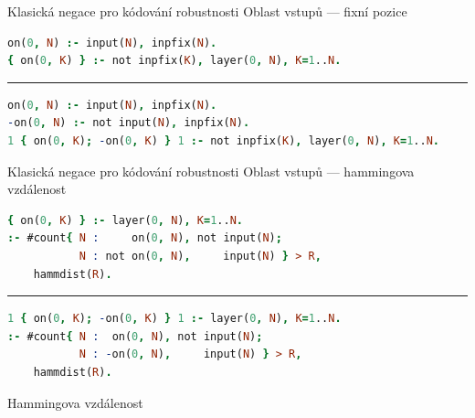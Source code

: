 \documentclass{beamer}
\begin{document}
    \begin{frame}[fragile]{Klasická negace pro kódování robustnosti}
        Oblast vstupů --- fixní pozice
\begin{lstlisting}[language=Prolog, numbers=none]
on(0, N) :- input(N), inpfix(N).
{ on(0, K) } :- not inpfix(K), layer(0, N), K=1..N.
\end{lstlisting}
        \hrule
\begin{lstlisting}[language=Prolog, numbers=none]
 on(0, N) :- input(N), inpfix(N).
-on(0, N) :- not input(N), inpfix(N).
1 { on(0, K); -on(0, K) } 1 :- not inpfix(K), layer(0, N), K=1..N.
\end{lstlisting}
    \end{frame}

    \begin{frame}[fragile]{Klasická negace pro kódování robustnosti}
        Oblast vstupů --- hammingova vzdálenost
\begin{lstlisting}[language=Prolog, numbers=none]
{ on(0, K) } :- layer(0, N), K=1..N.
:- #count{ N :     on(0, N), not input(N);
           N : not on(0, N),     input(N) } > R,
    hammdist(R).
\end{lstlisting}
        \hrule
\begin{lstlisting}[language=Prolog, numbers=none]
1 { on(0, K); -on(0, K) } 1 :- layer(0, N), K=1..N.
:- #count{ N :  on(0, N), not input(N);
           N : -on(0, N),     input(N) } > R,
    hammdist(R).
\end{lstlisting}
    \end{frame}

\begin{frame}{Hammingova vzdálenost}
\begin{figure}[p]%
\end{figure}
\end{frame}
\end{document}
